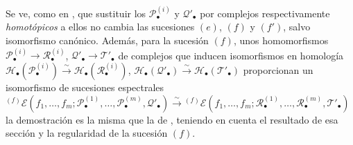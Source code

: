 \begin{remark}[6.9.5]
\label{III.6.9.5}
Se ve, como en , que sustituir los
$\mathscr P_\bullet^{(i)}$ y $\mathscr Q'_\bullet$ por complejos
respectivamente \emph{homotópicos} a ellos no cambia las sucesiones $(e)$, $(f)$ y
$(f')$, salvo isomorfismo canónico. Además, para la sucesión $(f)$, unos
homomorfismos
$\mathscr P_\bullet^{(i)}\to\mathscr R_\bullet^{(i)}$,
$\mathscr Q'_\bullet\to\mathscr T'_\bullet$ de complejos que inducen
isomorfismos en homología
$\mathscr H_\bullet(\mathscr P_\bullet^{(i)})\xrightarrow{\sim}
\mathscr H_\bullet(\mathscr R_\bullet^{(i)})$,
$\mathscr H_\bullet(\mathscr Q'_\bullet)\xrightarrow{\sim}
\mathscr H_\bullet(\mathscr T'_\bullet)$ proporcionan un isomorfismo de
sucesiones espectrales
${}^{(f)}\mathscr E
(f_1,\ldots,f_m;
\mathscr P_\bullet^{(1)},\ldots,\mathscr P_\bullet^{(m)},
\mathscr Q'_\bullet)
\xrightarrow{\sim}
{}^{(f)}\mathscr E
(f_1,\ldots,f_m;
\mathscr R_\bullet^{(1)},\ldots,\mathscr R_\bullet^{(m)},
\mathscr T'_\bullet)$
la demostración es la misma que la de , teniendo en cuenta
el resultado de esa sección y la regularidad de la sucesión $(f)$.
\end{remark}

